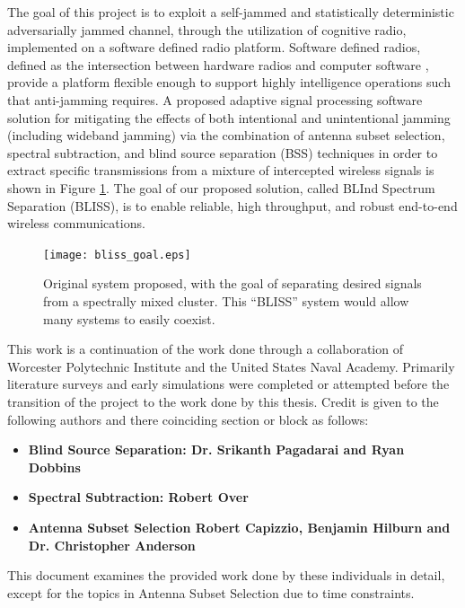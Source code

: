 The goal of this project is to exploit a self-jammed and statistically deterministic adversarially jammed channel, through the utilization of cognitive radio, implemented on a software defined radio platform.  Software defined radios, defined as the intersection between hardware radios and computer software \cite{4}, provide a platform flexible enough to support highly intelligence operations such that anti-jamming requires.  A proposed adaptive signal processing software solution for mitigating the effects of both intentional and unintentional jamming (including wideband jamming) via the combination of antenna subset selection, spectral subtraction, and blind source separation (BSS) techniques in order to extract specific transmissions from a mixture of intercepted wireless signals is shown in Figure \ref{bliss_goal}. The goal of our proposed solution, called BLInd Spectrum Separation (BLISS), is to enable reliable, high throughput, and robust end-to-end wireless communications.\\

\begin{figure}[!ht]\label{bliss_goal}
\centering
\texttt{[image: bliss\_goal.eps]}
\caption{Original system proposed, with the goal of separating desired signals from a spectrally mixed cluster.  This ``BLISS'' system would allow many systems to easily coexist.}
\end{figure}

This work is a continuation of the work done through a collaboration of Worcester Polytechnic Institute and the United States Naval Academy.  Primarily literature surveys and early simulations were completed or attempted before the transition of the project to the work done by this thesis.  Credit is given to the following authors and there coinciding section or block as follows: 

\begin{itemize}
\item \bf{Blind Source Separation:} Dr. Srikanth Pagadarai and Ryan Dobbins 
\item \bf{Spectral Subtraction:} Robert Over
\item \bf{Antenna Subset Selection} Robert Capizzio, Benjamin Hilburn and Dr. Christopher Anderson  
\end{itemize}

This document examines the provided work done by these individuals in detail, except for the topics in Antenna Subset Selection due to time constraints.\\

